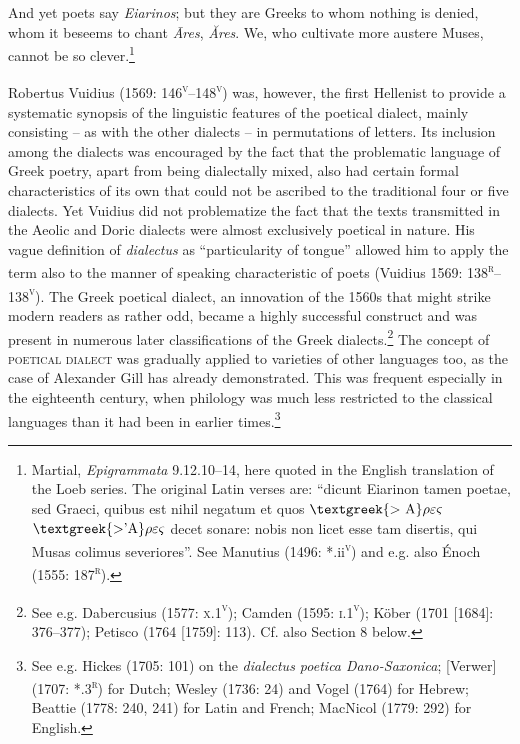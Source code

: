 \begin{styleQuote}
And yet poets say \textit{Eiarinos}; {\textbar} but they are Greeks to whom nothing is denied, {\textbar} whom it beseems to chant \textit{\=Ares}, \textit{Ăres}. {\textbar} We, who cultivate more austere Muses, {\textbar} cannot be so clever.\footnote{ Martial, \textit{Epigrammata} 9.12.10–14, here quoted in the English translation of the Loeb series. The original Latin verses are: “dicunt Eiarinon tamen poetae, {\textbar} sed Graeci, quibus est nihil negatum {\textbar} et quos $\text{\textgreek{>~A}}\rho \varepsilon \varsigma $ $\text{\textgreek{>'A}}\rho \varepsilon \varsigma $ decet sonare: {\textbar} nobis non licet esse tam disertis, {\textbar} qui Musas colimus severiores”. See Manutius (1496: *.ii\textsc{\textsuperscript{v}}) and e.g. also Énoch (1555: 187\textsc{\textsuperscript{r}}).}
\end{styleQuote}

\begin{styleStandard}
Robertus Vuidius (1569: 146\textsc{\textsuperscript{v}}–148\textsc{\textsuperscript{v}}) was, however, the first Hellenist to provide a systematic synopsis of the linguistic features of the poetical dialect, mainly consisting – as with the other dialects – in permutations of letters. Its inclusion among the dialects was encouraged by the fact that the problematic language of Greek poetry, apart from being dialectally mixed, also had certain formal characteristics of its own that could not be ascribed to the traditional four or five dialects. Yet Vuidius did not problematize the fact that the texts transmitted in the Aeolic and Doric dialects were almost exclusively poetical in nature. His vague definition of \textit{dialectus} as “particularity of tongue” allowed him to apply the term also to the manner of speaking characteristic of poets (Vuidius 1569: 138\textsc{\textsuperscript{r}}–138\textsc{\textsuperscript{v}}). The Greek poetical dialect, an innovation of the 1560s that might strike modern readers as rather odd, became a highly successful construct and was present in numerous later classifications of the Greek dialects.\footnote{ See e.g. Dabercusius (1577: \textsc{x}.1\textsc{\textsuperscript{v}}); Camden (1595: \textsc{i.1}\textsc{\textsuperscript{v}}); Köber (1701 [1684]: 376–377); Petisco (1764 [1759]: 113). Cf. also Section 8 below.} The concept of \textsc{poetical dialect} was gradually applied to varieties of other languages too, as the case of Alexander Gill has already demonstrated. This was frequent especially in the eighteenth century, when philology was much less restricted to the classical languages than it had been in earlier times.\footnote{ See e.g. Hickes (1705: 101) on the \textit{dialectus poetica Dano-Saxonica}; [Verwer] (1707: *.3\textsc{\textsuperscript{r}}) for Dutch; Wesley (1736: 24) and Vogel (1764) for Hebrew; Beattie (1778: 240, 241) for Latin and French; MacNicol (1779: 292) for English.}
\end{styleStandard}

